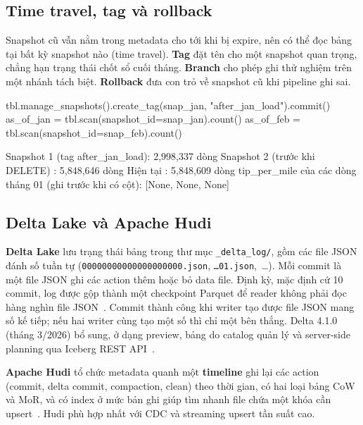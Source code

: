 \documentclass[12pt]{article}
\begin{document}
\subsection{Time travel, tag và rollback}

Snapshot cũ vẫn nằm trong metadata cho tới khi bị expire, nên có thể đọc bảng tại bất kỳ snapshot nào (time travel). \textbf{Tag} đặt tên cho một snapshot quan trọng, chẳng hạn trạng thái chốt sổ cuối tháng. \textbf{Branch} cho phép ghi thử nghiệm trên một nhánh tách biệt. \textbf{Rollback} đưa con trỏ về snapshot cũ khi pipeline ghi sai.

\begin{aivncodebox}
\begin{python}
tbl.manage_snapshots().create_tag(snap_jan, "after_jan_load").commit()
as_of_jan = tbl.scan(snapshot_id=snap_jan).count()
as_of_feb = tbl.scan(snapshot_id=snap_feb).count()
\end{python}
\end{aivncodebox}

\begin{aivnCodeOutput}[Output]
\begin{python}
Snapshot 1 (tag after_jan_load): 2,998,337 dòng
Snapshot 2 (trước khi DELETE)  : 5,848,646 dòng
Hiện tại                       : 5,848,609 dòng
tip_per_mile của các dòng tháng 01 (ghi trước khi có cột): [None, None, None]
\end{python}
\end{aivnCodeOutput}

\subsection{Delta Lake và Apache Hudi}

\textbf{Delta Lake} lưu trạng thái bảng trong thư mục \texttt{\_delta\_log/}, gồm các file JSON đánh số tuần tự (\texttt{00000000000000000000.json}, \texttt{\dots01.json},~\dots). Mỗi commit là một file JSON ghi các action thêm hoặc bỏ data file. Định kỳ, mặc định cứ 10 commit, log được gộp thành một checkpoint Parquet để reader không phải đọc hàng nghìn file JSON~\cite{delta2026protocol,armbrust2020delta}. Commit thành công khi writer tạo được file JSON mang số kế tiếp; nếu hai writer cùng tạo một số thì chỉ một bên thắng. Delta 4.1.0 (tháng 3/2026) bổ sung, ở dạng preview, bảng do catalog quản lý và server-side planning qua Iceberg REST API~\cite{delta2026release41}.

\textbf{Apache Hudi} tổ chức metadata quanh một \textbf{timeline} ghi lại các action (commit, delta commit, compaction, clean) theo thời gian, có hai loại bảng CoW và MoR, và có index ở mức bản ghi giúp tìm nhanh file chứa một khóa cần upsert~\cite{hudi2026timeline}. Hudi phù hợp nhất với CDC và streaming upsert tần suất cao.
\end{document}
